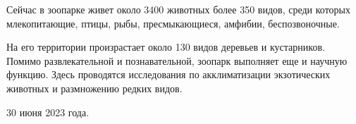 Сейчас в зоопарке живет около 3400 животных более 350 видов, среди которых
млекопитающие, птицы, рыбы, пресмыкающиеся, амфибии, беспозвоночные.

На его территории произрастает около 130 видов деревьев и кустарников. Помимо
развлекательной и познавательной, зоопарк выполняет еще и научную функцию.
Здесь проводятся исследования по акклиматизации экзотических животных и
размножению редких видов.

30 июня 2023 года.
